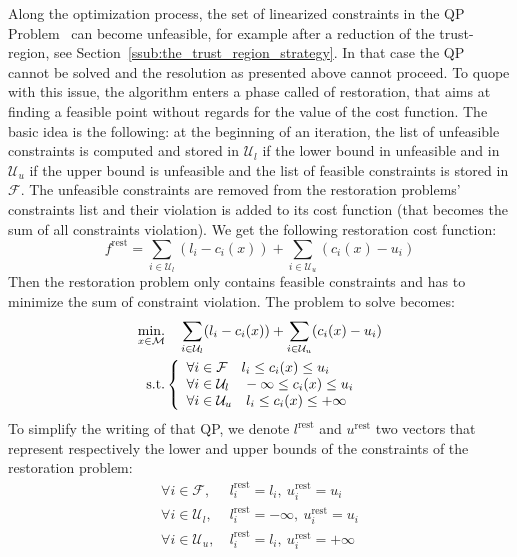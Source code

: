 Along the optimization process, the set of linearized constraints in the QP Problem~ can become unfeasible, for example after a reduction of the trust-region, see Section~\ref{ssub:the_trust_region_strategy}.
In that case the QP~ cannot be solved and the resolution as presented above cannot proceed.
To quope with this issue, the algorithm enters a phase called of restoration, that aims at finding a feasible point without regards for the value of the cost function.
The basic idea is the following: at the beginning of an iteration, the list of unfeasible constraints is computed and stored in $\mathcal{U}_l$ if the lower bound in unfeasible and in $\mathcal{U}_u$ if the upper bound is unfeasible and the list of feasible constraints is stored in $\mathcal{F}$.
The unfeasible constraints are removed from the restoration problems' constraints list and their violation is added to its cost function (that becomes the sum of all constraints violation).
We get the following restoration cost function:
\begin{equation}
  f^\text{rest} = \sum_{i\in\mathcal{U}_l} (l_i - c_i(x)) +\sum_{i\in\mathcal{U}_u} (c_i(x) - u_i)
\end{equation}
Then the restoration problem only contains feasible constraints and has to minimize the sum of constraint violation.
The problem to solve becomes:
\begin{align}
\label{eq:restoration_problem}
  \operatorname*{min.}_{x \in \mathcal{M}} & \quad \sum_{i\in\mathcal{U}_l} (l_i - c_i(x)) +\sum_{i\in\mathcal{U}_u} (c_i(x) - u_i)\\ \nonumber
  \text{s.t.}&\left\{
  \begin{array}{lr}
    \forall i \in \mathcal{F}   \quad l_i \leq c_i(x) \leq u_i \\
    \forall i \in \mathcal{U}_l \quad -\infty \leq c_i(x) \leq u_i \\
    \forall i \in \mathcal{U}_u \quad l_i \leq c_i(x) \leq +\infty \\
  \end{array}\right.
\end{align}
To simplify the writing of that QP, we denote $l^\text{rest}$ and $u^\text{rest}$ two vectors that represent respectively the lower and upper bounds of the constraints of the restoration problem:
\begin{align}
  \forall i \in \mathcal{F}   ,\ & l^\text{rest}_i = l_i    ,\ u^\text{rest}_i = u_i \\
  \forall i \in \mathcal{U}_l ,\ & l^\text{rest}_i = -\infty,\ u^\text{rest}_i = u_i \\
  \forall i \in \mathcal{U}_u ,\ & l^\text{rest}_i = l_i    ,\ u^\text{rest}_i = +\infty \\
\end{align}

